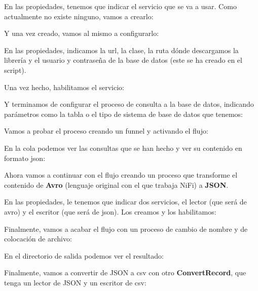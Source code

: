 \documentclass{../../miPlantilla}
\begin{document}

En las propiedades, tenemos que indicar el servicio que se va a usar. Como actualmente no existe ninguno, vamos a crearlo:


Y una vez creado, vamos al mismo a configurarlo:


En las propiedades, indicamos la url, la clase, la ruta dónde descargamos la librería y el usuario y contraseña de la base de datos (este se ha creado en el script).


\newpage

Una vez hecho, habilitamos el servicio:


Y terminamos de configurar el proceso de consulta a la base de datos, indicando parámetros como la tabla o el tipo de sistema de base de datos que tenemos:


Vamos a probar el proceso creando un funnel y activando el flujo:



\newpage

En la cola podemos ver las consultas que se han hecho y ver su contenido en formato json:


Ahora vamos a continuar con el flujo creando un proceso que transforme el contenido de \textbf{Avro} (lenguaje original con el que trabaja NiFi) a \textbf{JSON}.


En las propiedades, le tenemos que indicar dos servicios, el lector (que será de avro) y el escritor (que será de json). Los creamos y los habilitamos:


Finalmente, vamos a acabar el flujo con un proceso de cambio de nombre y de colocación de archivo:


\newpage

En el directorio de salida podemos ver el resultado:


Finalmente, vamos a convertir de JSON a csv con otro \textbf{ConvertRecord}, que tenga un lector de JSON y un escritor de csv:
\end{document}
